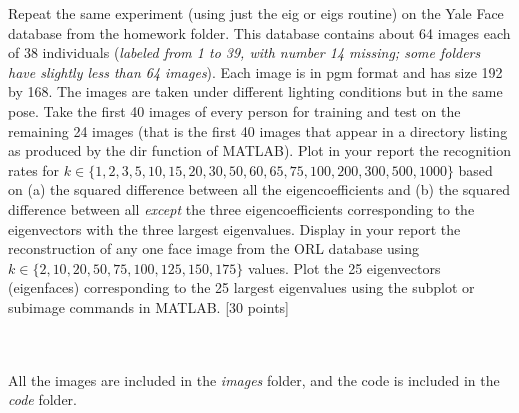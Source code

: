 \documentclass{article}
\begin{document}
\begin{enumerate}
    Repeat the same experiment (using just the \textsf{eig} or \textsf{eigs} routine) on the Yale Face database from the homework folder. This database contains about 64 images each of 38 individuals (\textit{labeled from 1 to 39, with number 14 missing; some folders have slightly less than 64 images}). Each image is in pgm format and has size 192 by 168. The images are taken under different lighting conditions but in the same pose. Take the first 40 images of every person for training and test on the remaining 24 images (that is the first 40 images that appear in a directory listing as produced by the \textsf{dir} function of MATLAB). Plot in your report the recognition rates for $k \in \{1,2,3,5,10,15,20,30,50,60, 65,75,100,200,300,500,1000\}$ based on (a) the squared difference between all the eigencoefficients and (b) the squared difference between all \emph{except} the three eigencoefficients corresponding to the eigenvectors with the three largest eigenvalues. Display in your report the reconstruction of any one face image from the ORL database using $k \in \{2,10,20,50,75,100,125, 150,175\}$ values. Plot the 25 eigenvectors (eigenfaces) corresponding to the 25 largest eigenvalues using the subplot or subimage commands in MATLAB. \textsf{[30 points]}

\\
\\
\newpage
All the images are included in the \emph{images} folder, and the code is included in the \emph{code} folder.

\end{enumerate}
\end{document}
